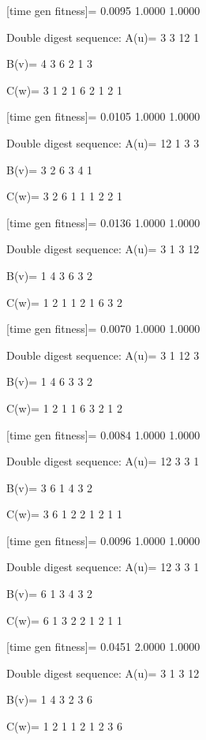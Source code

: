 [time gen fitness]=
    0.0095    1.0000    1.0000

Double digest sequence:
A(u)=
     3     3    12     1

B(v)=
     4     3     6     2     1     3

C(w)=
     3     1     2     1     6     2     1     2     1

[time gen fitness]=
    0.0105    1.0000    1.0000

Double digest sequence:
A(u)=
    12     1     3     3

B(v)=
     3     2     6     3     4     1

C(w)=
     3     2     6     1     1     1     2     2     1

[time gen fitness]=
    0.0136    1.0000    1.0000

Double digest sequence:
A(u)=
     3     1     3    12

B(v)=
     1     4     3     6     3     2

C(w)=
     1     2     1     1     2     1     6     3     2

[time gen fitness]=
    0.0070    1.0000    1.0000

Double digest sequence:
A(u)=
     3     1    12     3

B(v)=
     1     4     6     3     3     2

C(w)=
     1     2     1     1     6     3     2     1     2

[time gen fitness]=
    0.0084    1.0000    1.0000

Double digest sequence:
A(u)=
    12     3     3     1

B(v)=
     3     6     1     4     3     2

C(w)=
     3     6     1     2     2     1     2     1     1

[time gen fitness]=
    0.0096    1.0000    1.0000

Double digest sequence:
A(u)=
    12     3     3     1

B(v)=
     6     1     3     4     3     2

C(w)=
     6     1     3     2     2     1     2     1     1

[time gen fitness]=
    0.0451    2.0000    1.0000

Double digest sequence:
A(u)=
     3     1     3    12

B(v)=
     1     4     3     2     3     6

C(w)=
     1     2     1     1     2     1     2     3     6

